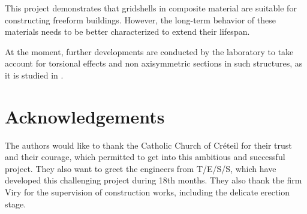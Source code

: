 This project demonstrates that gridshells in composite material are suitable for constructing freeform buildings. However, the long-term behavior of these materials needs to be better characterized to extend their lifespan.

At the moment, further developments are conducted by the laboratory to take account for torsional effects and non axisymmetric sections in such structures, as it is studied in \cite{Barnes2013}.

\section{Acknowledgements}
The authors would like to thank the Catholic Church of Créteil for their trust and their courage, which permitted to get into this ambitious and successful project. They also want to greet the engineers from T/E/S/S, which have developed this challenging project during 18th months. They also thank the firm Viry for the supervision of construction works, including the delicate erection stage.

%
%
%
%


